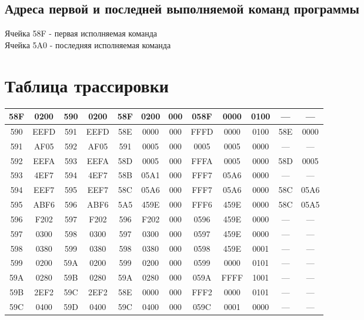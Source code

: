 \subsection{Адреса первой и последней выполняемой команд программы}
\noindent Ячейка 58F - первая исполняемая команда\\
Ячейка 5A0 - последняя исполняемая команда\\

\newpage

\section{Таблица трассировки}
\begin{center}
	\begin{tabular}{|c|c|c|c|c|c|c|c|c|c|c|c|}
		\hline
		58F & 0200 & 590 & 0200 & 58F & 0200 & 000 & 058F & 0000 & 0100 & --- & ---\\
		\hline
		590 & EEFD & 591 & EEFD & 58E & 0000 & 000 & FFFD & 0000 & 0100 & 58E & 0000\\
		\hline
		591 & AF05 & 592 & AF05 & 591 & 0005 & 000 & 0005 & 0005 & 0000 & --- & ---\\
		\hline
		592 & EEFA & 593 & EEFA & 58D & 0005 & 000 & FFFA & 0005 & 0000 & 58D & 0005\\
		\hline
		593 & 4EF7 & 594 & 4EF7 & 58B & 05A1 & 000 & FFF7 & 05A6 & 0000 & --- & ---\\
		\hline
		594 & EEF7 & 595 & EEF7 & 58C & 05A6 & 000 & FFF7 & 05A6 & 0000 & 58C & 05A6\\
		\hline
		595 & ABF6 & 596 & ABF6 & 5A5 & 459E & 000 & FFF6 & 459E & 0000 & 58C & 05A5\\
		\hline
		596 & F202 & 597 & F202 & 596 & F202 & 000 & 0596 & 459E & 0000 & --- & ---\\
		\hline
		597 & 0300 & 598 & 0300 & 597 & 0300 & 000 & 0597 & 459E & 0000 & --- & ---\\
		\hline
		598 & 0380 & 599 & 0380 & 598 & 0380 & 000 & 0598 & 459E & 0001 & --- & ---\\
		\hline
		599 & 0200 & 59A & 0200 & 599 & 0200 & 000 & 0599 & 0000 & 0101 & --- & ---\\
		\hline
		59A & 0280 & 59B & 0280 & 59A & 0280 & 000 & 059A & FFFF & 1001 & --- & ---\\
		\hline
		59B & 2EF2 & 59C & 2EF2 & 58E & 0000 & 000 & FFF2 & 0000 & 0101 & --- & ---\\
		\hline
		59C & 0400 & 59D & 0400 & 59C & 0400 & 000 & 059C & 0001 & 0000 & --- & ---\\

\end{tabular}
\end{center}
